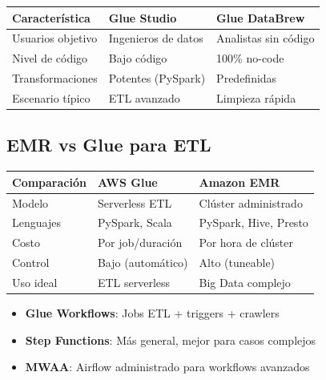 \documentclass[12pt,a4paper]{report}
\begin{document}
\begin{center}
\begin{longtable}{|p{3cm}|p{5cm}|p{5cm}|}
\hline
\cellcolor{awsblue!20}\textbf{Característica} & \cellcolor{awsblue!20}\textbf{Glue Studio} & \cellcolor{awsblue!20}\textbf{Glue DataBrew} \\
\hline
Usuarios objetivo & Ingenieros de datos & Analistas sin código \\
\hline
Nivel de código & Bajo código & 100\% no-code \\
\hline
Transformaciones & Potentes (PySpark) & Predefinidas \\
\hline
Escenario típico & ETL avanzado & Limpieza rápida \\
\hline
\end{longtable}
\end{center}

\subsection{EMR vs Glue para ETL}

\begin{center}
\begin{longtable}{|p{3cm}|p{5cm}|p{5cm}|}
\hline
\cellcolor{awsblue!20}\textbf{Comparación} & \cellcolor{awsblue!20}\textbf{AWS Glue} & \cellcolor{awsblue!20}\textbf{Amazon EMR} \\
\hline
Modelo & Serverless ETL & Clúster administrado \\
\hline
Lenguajes & PySpark, Scala & PySpark, Hive, Presto \\
\hline
Costo & Por job/duración & Por hora de clúster \\
\hline
Control & Bajo (automático) & Alto (tuneable) \\
\hline
\cellcolor{successgreen!20}Uso ideal & ETL serverless & Big Data complejo \\
\hline
\end{longtable}
\end{center}

\begin{tipbox}
\begin{itemize}
    \item \textbf{Glue Workflows}: Jobs ETL + triggers + crawlers
    \item \textbf{Step Functions}: Más general, mejor para casos complejos
    \item \textbf{MWAA}: Airflow administrado para workflows avanzados
\end{itemize}
\end{tipbox}
\end{document}
